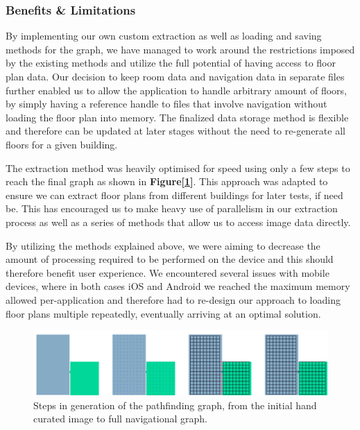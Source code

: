 \documentclass[12pt,a4paper]{report}
\begin{document}
\subsubsection{Benefits \& Limitations}
By implementing our own custom extraction as well as loading and saving methods for the graph, we have managed to work around the restrictions imposed by the existing methods and utilize the full potential of having access to floor plan data. Our decision to keep room data and navigation data in separate files further enabled us to allow the application to handle arbitrary amount of floors, by simply having a reference handle to files that involve navigation without loading the floor plan into memory. The finalized data storage method is flexible and therefore can be updated at later stages without the need to re-generate all floors for a given building.
\newline

The extraction method was heavily optimised for speed using only a few steps to reach the final graph as shown in \textbf{Figure[\ref{fig:nav_graph}]}. This approach was adapted to ensure we can extract floor plans from different buildings for later tests, if need be. This has encouraged us to make heavy use of parallelism in our extraction process as well as a series of methods that allow us to access image data directly. 
\newline

By utilizing the methods explained above, we were aiming to decrease the amount of processing required to be performed on the device and this should therefore benefit user experience. We encountered several issues with mobile devices, where in both cases iOS and Android we reached the maximum memory allowed per-application and therefore had to re-design our approach to loading floor plans multiple repeatedly, eventually arriving at an optimal solution.
\begin{figure}[h]
\center
\includegraphics[trim=0 0 0 0, clip,width=\textwidth,height=\textheight,keepaspectratio]{images/graphGeneration.pdf}
\caption{Steps in generation of the pathfinding graph, from the initial hand curated image to full navigational graph.}
\label{fig:nav_graph}
\end{figure}
\end{document}
